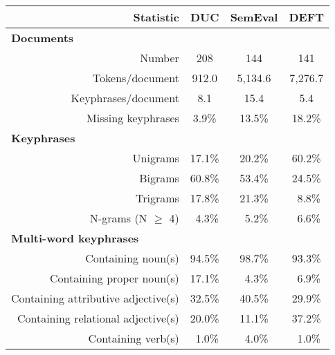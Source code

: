     \begin{table}
      \centering
      \begin{tabular}{lr|ccc}
        \toprule
        & \textbf{Statistic} & \textbf{DUC} & \textbf{SemEval} & \textbf{DEFT}\\
        \hline
        \multicolumn{2}{l|}{\textbf{Documents}}\\
        \multicolumn{2}{r|}{Number} & 208 & 144 & 141\\
        \multicolumn{2}{r|}{Tokens/document} & 912.0 & 5,134.6 & 7,276.7\\
        \multicolumn{2}{r|}{Keyphrases/document} & 8.1 & 15.4 & 5.4\\
        \multicolumn{2}{r|}{Missing keyphrases} & 3.9\% & 13.5\% & 18.2\%\\
        \hline
        \multicolumn{2}{l|}{\textbf{Keyphrases}}\\
        \multicolumn{2}{r|}{Unigrams} & 17.1\% & 20.2\% & 60.2\%\\
        \multicolumn{2}{r|}{Bigrams} & 60.8\% & 53.4\% & 24.5\%\\
        \multicolumn{2}{r|}{Trigrams} & 17.8\% & 21.3\% & $~~$8.8\%\\
        \multicolumn{2}{r|}{N-grams (N $\geq$ 4)} & $~~$4.3\% & $~~$5.2\% & $~~$6.6\%\\
        \hline
        \multicolumn{2}{l|}{\textbf{Multi-word keyphrases}}\\
        \multicolumn{2}{r|}{Containing noun(s)} & 94.5\% & 98.7\% & 93.3\%\\
        \multicolumn{2}{r|}{Containing proper noun(s)} & 17.1\% & $~~$4.3\% & $~~$6.9\%\\
        \multicolumn{2}{r|}{Containing attributive adjective(s)} & 32.5\% & 40.5\% & 29.9\%\\
        \multicolumn{2}{r|}{Containing relational adjective(s)} & 20.0\% & 11.1\% & 37.2\%\\
        \multicolumn{2}{r|}{Containing verb(s)} & $~~$1.0\% & $~~$4.0\% & $~~$1.0\%\\

\end{tabular}
\end{table}
